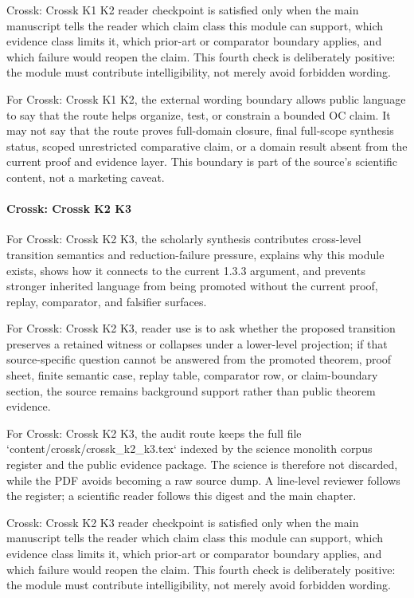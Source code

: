 Crossk: Crossk K1 K2 reader checkpoint is satisfied only when the main manuscript tells the reader which claim class this module can support, which evidence class limits it, which prior-art or comparator boundary applies, and which failure would reopen the claim. This fourth check is deliberately positive: the module must contribute intelligibility, not merely avoid forbidden wording.


For Crossk: Crossk K1 K2, the external wording boundary allows public language to say that the route helps organize, test, or constrain a bounded OC claim. It may not say that the route proves full-domain closure, final full-scope synthesis status, scoped unrestricted comparative claim, or a domain result absent from the current proof and evidence layer. This boundary is part of the source's scientific content, not a marketing caveat.


\paragraph{Crossk: Crossk K2 K3}

For Crossk: Crossk K2 K3, the scholarly synthesis contributes cross-level transition semantics and reduction-failure pressure, explains why this module exists, shows how it connects to the current 1.3.3 argument, and prevents stronger inherited language from being promoted without the current proof, replay, comparator, and falsifier surfaces.


For Crossk: Crossk K2 K3, reader use is to ask whether the proposed transition preserves a retained witness or collapses under a lower-level projection; if that source-specific question cannot be answered from the promoted theorem, proof sheet, finite semantic case, replay table, comparator row, or claim-boundary section, the source remains background support rather than public theorem evidence.


For Crossk: Crossk K2 K3, the audit route keeps the full file `content/crossk/crossk\_k2\_k3.tex` indexed by the science monolith corpus register and the public evidence package. The science is therefore not discarded, while the PDF avoids becoming a raw source dump. A line-level reviewer follows the register; a scientific reader follows this digest and the main chapter.


Crossk: Crossk K2 K3 reader checkpoint is satisfied only when the main manuscript tells the reader which claim class this module can support, which evidence class limits it, which prior-art or comparator boundary applies, and which failure would reopen the claim. This fourth check is deliberately positive: the module must contribute intelligibility, not merely avoid forbidden wording.



